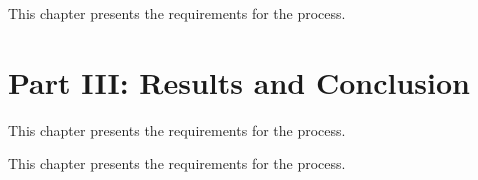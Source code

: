 \noindent  This chapter presents the requirements for the process. \\

\section*{Part III: Results and Conclusion}

  \vspace{1mm}

\noindent  This chapter presents the requirements for the process. \\

  \vspace{1mm}

\noindent  This chapter presents the requirements for the process.
